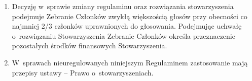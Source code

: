 \documentclass[11pt,a4paper]{article}
\begin{document}
\begin{enumerate}
  \item Decyzję w~sprawie zmiany regulaminu oraz rozwiązania stowarzyszenia podejmuje Zebranie Członków zwykłą większością głosów przy obecności co najmniej 2/3 członków uprawnionych do głosowania. Podejmując uchwałę o~rozwiązaniu Stowarzyszenia Zebranie Członków określa przeznaczenie pozostałych środków finansowych Stowarzyszenia.

  \item W~sprawach nieuregulowanych niniejszym Regulaminem zastosowanie mają przepisy ustawy -- Prawo o~stowarzyszeniach.
\end{enumerate}
\end{document}
